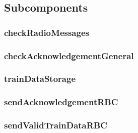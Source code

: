 \subsection{Subcomponents}\label{s:traindata_subcomponents}


\subsubsection{checkRadioMessages}


\subsubsection{checkAcknowledgementGeneral}


\subsubsection{trainDataStorage}


\subsubsection{sendAcknowledgementRBC}


\subsubsection{sendValidTrainDataRBC}



